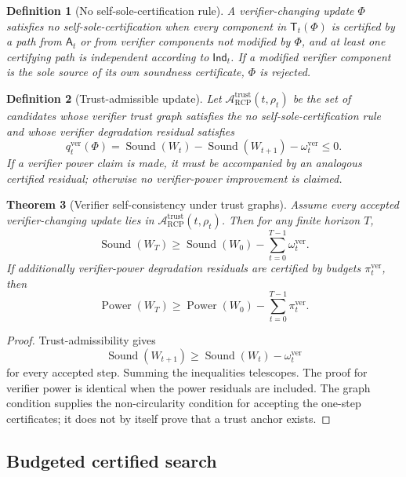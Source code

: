 \documentclass[11pt]{article}
\newtheorem{theorem}{Theorem}[section]
\newtheorem{definition}[theorem]{Definition}
\newcommand{\Acal}{\mathcal{A}}
\newcommand{\1}{\mathbf{1}}
\newcommand{\RCP}{\mathrm{RCP}}
\newcommand{\Sound}{\operatorname{Sound}}
\providecommand{\ver}{\mathrm{ver}}
\providecommand{\Power}{\operatorname{Power}}
\begin{document}
\begin{definition}[No self-sole-certification rule]
\label{def:no_self_sole_certification_rule}
A verifier-changing update \(\Phi\) satisfies no self-sole-certification when every component in \(\mathsf T_t(\Phi)\) is certified by a path from \(\mathsf A_t\) or from verifier components not modified by \(\Phi\), and at least one certifying path is independent according to \(\mathsf{Ind}_t\).  If a modified verifier component is the sole source of its own soundness certificate, \(\Phi\) is rejected.
\end{definition}

\begin{definition}[Trust-admissible update]
\label{def:trust_admissible_update_operational}
Let \(\Acal_{\RCP}^{\mathrm{trust}}(t,\rho_t)\) be the set of candidates whose verifier trust graph satisfies the no self-sole-certification rule and whose verifier degradation residual satisfies
\[
q_t^{\ver}(\Phi)
=\Sound(W_t)-\Sound(W_{t+1})-\omega_t^{\ver}
\le0.
\]
If a verifier power claim is made, it must be accompanied by an analogous certified residual; otherwise no verifier-power improvement is claimed.
\end{definition}

\begin{theorem}[Verifier self-consistency under trust graphs]
\label{thm:verifier_self_consistency_trust_graph}
Assume every accepted verifier-changing update lies in \(\Acal_{\RCP}^{\mathrm{trust}}(t,\rho_t)\).  Then for any finite horizon \(T\),
\[
\Sound(W_T)
\ge
\Sound(W_0)-\sum_{t=0}^{T-1}\omega_t^{\ver}.
\]
If additionally verifier-power degradation residuals are certified by budgets \(\pi_t^{\ver}\), then
\[
\Power(W_T)
\ge
\Power(W_0)-\sum_{t=0}^{T-1}\pi_t^{\ver}.
\]
\end{theorem}

\begin{proof}
Trust-admissibility gives
\[
\Sound(W_{t+1})\ge\Sound(W_t)-\omega_t^{\ver}
\]
for every accepted step.  Summing the inequalities telescopes.  The proof for verifier power is identical when the power residuals are included.  The graph condition supplies the non-circularity condition for accepting the one-step certificates; it does not by itself prove that a trust anchor exists.
\end{proof}

\subsection{Budgeted certified search}
\end{document}
